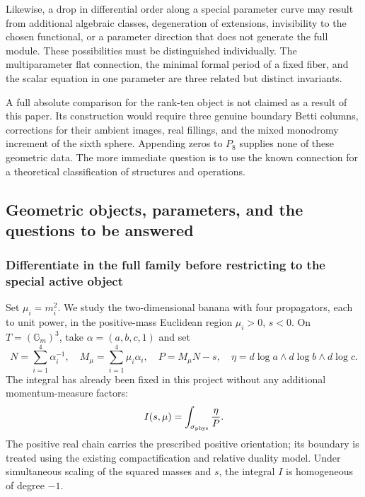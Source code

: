\documentclass[11pt,a4paper,oneside]{article}
\theoremstyle{plain}
\theoremstyle{definition}
\theoremstyle{remark}
\newcommand{\Q}{\mathbb Q}
\newcommand{\C}{\mathbb C}
\newcommand{\Gr}{\operatorname{Gr}}
\newcommand{\Res}{\operatorname{Res}}
\newcommand{\dR}{\mathrm{dR}}
\numberwithin{equation}{section}
\begin{document}
Likewise, a drop in differential order along a special parameter curve may result from additional algebraic classes, degeneration of extensions, invisibility to the chosen functional, or a parameter direction that does not generate the full module. These possibilities must be distinguished individually. The multiparameter flat connection, the minimal formal period of a fixed fiber, and the scalar equation in one parameter are three related but distinct invariants.

A full absolute comparison for the rank-ten object is not claimed as a result of this paper. Its construction would require three genuine boundary Betti columns, corrections for their ambient images, real fillings, and the mixed monodromy increment of the sixth sphere. Appending zeros to $P_8$ supplies none of these geometric data. The more immediate question is to use the known connection for a theoretical classification of structures and operations.




\endgroup



\begingroup
\providecommand{\Q}{\mathbb Q}
\providecommand{\C}{\mathbb C}
\providecommand{\dR}{\mathrm{dR}}
\providecommand{\Ann}{\operatorname{Ann}}
\providecommand{\Gr}{\operatorname{Gr}}
\providecommand{\Res}{\operatorname{Res}}
\providecommand{\rk}{\operatorname{rk}}
\providecommand{\cE}{\mathcal E}
\providecommand{\cM}{\mathcal M}
\subsection{Geometric objects, parameters, and the questions to be answered}
\subsubsection{Differentiate in the full family before restricting to the special active object}
Set $\mu_i=m_i^2$. We study the two-dimensional banana with four propagators, each to unit power, in the positive-mass Euclidean region $\mu_i>0$, $s<0$.
On $T=(\mathbb G_m)^3$, take $\alpha=(a,b,c,1)$ and set
\begin{equation}\label{deriv:eq:raw}
 N=\sum_{i=1}^4\alpha_i^{-1},\quad M_\mu=\sum_{i=1}^4\mu_i\alpha_i,
 \quad P=M_\mu N-s,\quad
 \eta=d\log a\wedge d\log b\wedge d\log c.
\end{equation}
The integral has already been fixed in this project without any additional momentum-measure factors:
\begin{equation}\label{deriv:eq:I}
 I(s,\mu)=\int_{\sigma_{\rm phys}}\frac{\eta}{P}.
\end{equation}
The positive real chain carries the prescribed positive orientation; its boundary is treated using the existing compactification and relative duality model.
Under simultaneous scaling of the squared masses and $s$, the integral $I$ is homogeneous of degree $-1$.
\end{document}
